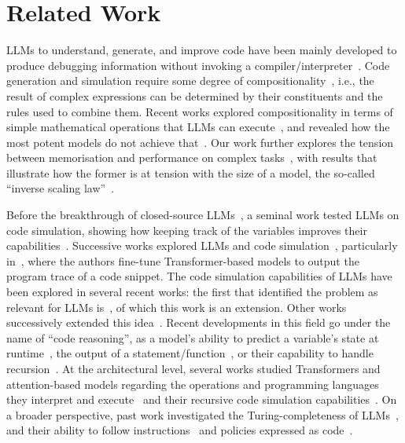 \section{Related Work}
LLMs to understand, generate, and improve code have been mainly developed to produce debugging information without invoking a compiler/interpreter~\cite{hou2023large,santos2023always,chen2021evaluating,widjojo2023addressing,zan2023large}.
Code generation and simulation require some degree of compositionality~\cite{mccoy2023much}, i.e., the result of complex expressions can be determined by their constituents and the rules used to combine them.
Recent works explored compositionality in terms of simple mathematical operations that LLMs can execute~\cite{frieder2023mathematical,yang2023code,yuan2023well}, and revealed how the most potent models do not achieve that~\cite{mccoy2023embers,west2023generative}.
Our work further explores the tension between memorisation and performance on complex tasks~\cite{berglund2023reversal,eldan2023s,yang2023code}, with results that illustrate how the former is at tension with the size of a model, the so-called ``inverse scaling law''~\cite{biderman2023emergent}.

Before the breakthrough of closed-source LLMs~\cite{la2023arrt}, a seminal work tested LLMs on code simulation, showing how keeping track of the variables improves their capabilities~\cite{nye2021show}. Successive works explored LLMs and code simulation~\cite{chen2024language,tufano2023predicting,zhou2023algorithms}, particularly in~\cite{liu2023code}, where the authors fine-tune Transformer-based models to output the program trace of a code snippet. 
The code simulation capabilities of LLMs have been explored in several recent works: the first that identified the problem as relevant for LLMs is~\cite{la2024code}, of which this work is an extension. Other works successively extended this idea~\cite{lyu2024largelanguagemodelscode}.
Recent developments in this field go under the name of ``code reasoning'', as a model's ability to predict a variable's state at runtime~\cite{chen2024evaluating}, the output of a statement/function~\cite{gu2024cruxeval,liu2024codemind}, or their capability to handle recursion~\cite{zhang2024transformerbased}.
At the architectural level, several works studied Transformers and attention-based models regarding the operations and programming languages they interpret and execute~\cite{weiss2021thinking} and their recursive code simulation capabilities~\cite{zhang2023can}.
On a broader perspective, past work investigated the Turing-completeness of LLMs~\cite{giannou2023looped,perez2021attention,schuurmans2023memory,wei2022statistically}, and their ability to follow instructions~\cite{ouyang2022training} and policies expressed as code~\cite{liang2023code}.